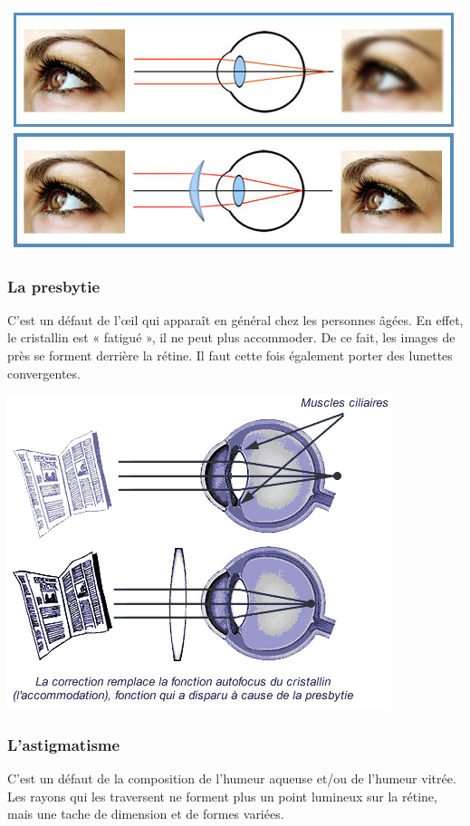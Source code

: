 \documentclass[a4paper, 12pt, onecolumn, openany]{report}
\begin{document}
	\includegraphics[scale=0.5]{hypermetropie.jpg}
	
	\subsubsection{La presbytie}
	C’est un défaut de l’œil qui apparaît en général chez les personnes âgées. En effet, le cristallin est « fatigué », il ne peut plus accommoder. De ce fait, les images de près se forment derrière la rétine. Il faut cette fois également porter des lunettes convergentes.
	
	\includegraphics[scale=0.7]{presbytie.png}
	
	\subsubsection{L'astigmatisme}
	C’est un défaut de la composition de l’humeur aqueuse et/ou de l’humeur vitrée. Les rayons qui les traversent ne forment plus un point lumineux sur la rétine, mais une tache de dimension et de formes variées.
	
\end{document}
